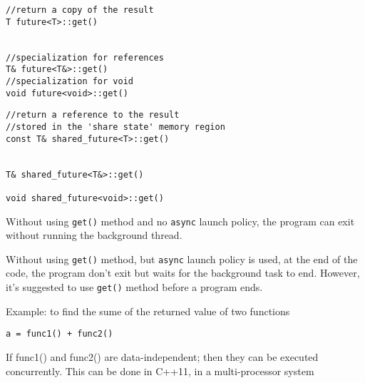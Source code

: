 \begin{minipage}[t]{0.5\textwidth}
\begin{verbatim}
//return a copy of the result
T future<T>::get()    


//specialization for references
T& future<T&>::get() 
//specialization for void
void future<void>::get()
\end{verbatim}
\end{minipage}
\begin{minipage}[t]{0.5\textwidth}
\begin{verbatim}
//return a reference to the result
//stored in the 'share state' memory region
const T& shared_future<T>::get()   


T& shared_future<T&>::get()
    
void shared_future<void>::get()  
\end{verbatim}
\end{minipage}

\begin{mdframed}
Without using \verb!get()! method and no \verb!async! launch policy, the program
can exit without running the background thread.

Without using \verb!get()! method, but \verb!async! launch policy is used, at
the end of the code, the program don't exit but waits for the background
task to end. However, it's suggested to use \verb!get()! method before a program
ends. 
\end{mdframed}

Example: to find the sume of the returned value of two functions
\begin{verbatim}
a = func1() + func2()
\end{verbatim}
If func1() and func2() are data-independent; then they can be executed
concurrently. This can be done in C++11, in a multi-processor system

